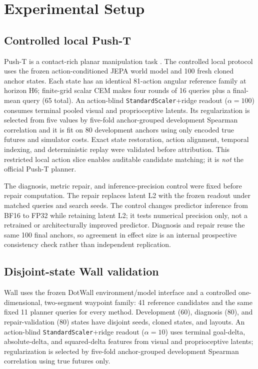 \section{Experimental Setup}
\label{sec:experiments}

\subsection{Controlled local Push-T}

Push-T is a contact-rich planar manipulation task \citep{florence2022ibc}. The controlled local protocol uses the frozen action-conditioned JEPA world model and 100 fresh cloned anchor states. Each state has an identical 81-action angular reference family at horizon H6; finite-grid scalar CEM makes four rounds of 16 queries plus a final-mean query (65 total). An action-blind \texttt{StandardScaler}+ridge readout ($\alpha=100$) consumes terminal pooled visual and proprioceptive latents. Its regularization is selected from five values by five-fold anchor-grouped development Spearman correlation and it is fit on 80 development anchors using only encoded true futures and simulator costs. Exact state restoration, action alignment, temporal indexing, and deterministic replay were validated before attribution. This restricted local action slice enables auditable candidate matching; it is \emph{not} the official Push-T planner.

The diagnosis, metric repair, and inference-precision control were fixed before repair computation. The repair replaces latent L2 with the frozen readout under matched queries and search seeds. The control changes predictor inference from BF16 to FP32 while retaining latent L2; it tests numerical precision only, not a retrained or architecturally improved predictor. Diagnosis and repair reuse the same 100 final anchors, so agreement in effect size is an internal prospective consistency check rather than independent replication.

\subsection{Disjoint-state Wall validation}

Wall uses the frozen DotWall environment/model interface and a controlled one-dimensional, two-segment waypoint family: 41 reference candidates and the same fixed 11 planner queries for every method. Development (60), diagnosis (80), and repair-validation (80) states have disjoint seeds, cloned states, and layouts. An action-blind \texttt{StandardScaler}+ridge readout ($\alpha=10$) uses terminal goal-delta, absolute-delta, and squared-delta features from visual and proprioceptive latents; regularization is selected by five-fold anchor-grouped development Spearman correlation using true futures only.

